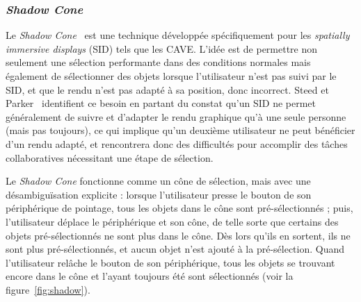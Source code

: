 	\subsubsection{\emph{Shadow Cone}}
	Le \emph{Shadow Cone}~\cite{steed20043d} est une technique développée spécifiquement pour les \emph{spatially immersive displays} (SID) tels que les CAVE. L'idée est de permettre non seulement une sélection performante dans des conditions \og normales \fg{} mais également de sélectionner des objets lorsque l'utilisateur n'est pas suivi par le SID, et que le rendu n'est pas adapté à sa position, donc incorrect. Steed et Parker~\cite{steed20043d} identifient ce besoin en partant du constat qu'un SID ne permet généralement de suivre et d'adapter le rendu graphique qu'à une seule personne (mais pas toujours\footnotemark), ce qui implique qu'un deuxième utilisateur ne peut bénéficier d'un rendu adapté, et rencontrera donc des difficultés pour accomplir des tâches collaboratives nécessitant une étape de sélection.
	
	
	Le \emph{Shadow Cone} fonctionne comme un cône de sélection, mais avec une désambiguïsation explicite : lorsque l'utilisateur presse le bouton de son périphérique de pointage, tous les objets dans le cône sont pré-sélectionnés ; puis, l'utilisateur déplace le périphérique et son cône, de telle sorte que certains des objets pré-sélectionnés ne sont plus dans le cône. Dès lors qu'ils en sortent, ils ne sont plus pré-sélectionnés, et aucun objet n'est ajouté à la pré-sélection. Quand l'utilisateur relâche le bouton de son périphérique, tous les objets se trouvant encore dans le cône et l'ayant toujours été sont sélectionnés (voir la figure~\ref{fig:shadow}).
	
